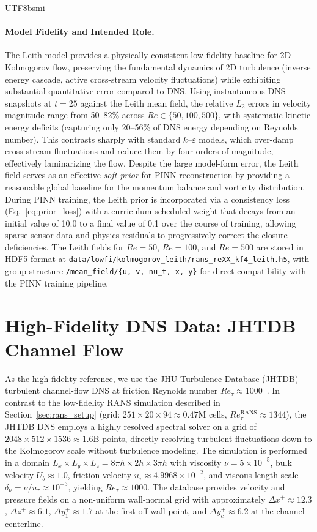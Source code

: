 \documentclass[master]{NTHUthesis}
\begin{document}
\begin{CJK*}{UTF8}{bsmi}
\paragraph{Model Fidelity and Intended Role.}
The Leith model provides a physically consistent low-fidelity baseline for 2D Kolmogorov flow, preserving the fundamental dynamics of 2D turbulence (inverse energy cascade, active cross-stream velocity fluctuations) while exhibiting substantial quantitative error compared to DNS. Using instantaneous DNS snapshots at $t=25$ against the Leith mean field, the relative $L_2$ errors in velocity magnitude range from 50--82\% across $Re \in \{50, 100, 500\}$, with systematic kinetic energy deficits (capturing only 20--56\% of DNS energy depending on Reynolds number). This contrasts sharply with standard $k$--$\varepsilon$ models, which over-damp cross-stream fluctuations and reduce them by four orders of magnitude, effectively laminarizing the flow. Despite the large model-form error, the Leith field serves as an effective \emph{soft prior} for PINN reconstruction by providing a reasonable global baseline for the momentum balance and vorticity distribution. During PINN training, the Leith prior is incorporated via a consistency loss (Eq.~\ref{eq:prior_loss}) with a curriculum-scheduled weight that decays from an initial value of 10.0 to a final value of 0.1 over the course of training, allowing sparse sensor data and physics residuals to progressively correct the closure deficiencies. The Leith fields for $Re=50$, $Re=100$, and $Re=500$ are stored in HDF5 format at \texttt{data/lowfi/kolmogorov\_leith/rans\_reXX\_kf4\_leith.h5}, with group structure \texttt{/mean\_field/\{u, v, nu\_t, x, y\}} for direct compatibility with the PINN training pipeline.

\section{High-Fidelity DNS Data: JHTDB Channel Flow}
\label{sec:jhtdb_data}
As the high-fidelity reference, we use the JHU Turbulence Database (JHTDB) turbulent channel-flow DNS at friction Reynolds number $Re_\tau \approx 1000$~\cite{Graham2016JoT, Lee2015JFM}. 
In contrast to the low-fidelity RANS simulation described in Section~\ref{sec:rans_setup} (grid: $251 \times 20 \times 94 \approx 0.47$M cells, $Re_\tau^{\text{RANS}} \approx 1344$), the JHTDB DNS employs a highly resolved spectral solver on a grid of $2048 \times 512 \times 1536 \approx 1.6$B points, directly resolving turbulent fluctuations down to the Kolmogorov scale without turbulence modeling. 
The simulation is performed in a domain $L_x \times L_y \times L_z = 8\pi h \times 2h \times 3\pi h$ with viscosity $\nu = 5\times10^{-5}$, bulk velocity $U_b \approx 1.0$, friction velocity $u_\tau \approx 4.9968\times10^{-2}$, and viscous length scale $\delta_\nu = \nu/u_\tau \approx 10^{-3}$, yielding $Re_\tau \approx 1000$. The database provides velocity and pressure fields on a non-uniform wall-normal grid with approximately $\Delta x^+ \approx 12.3$, $\Delta z^+ \approx 6.1$, $\Delta y_1^+ \approx 1.7$ at the first off-wall point, and $\Delta y_c^+ \approx 6.2$ at the channel centerline.


\end{CJK*}
\end{document}
